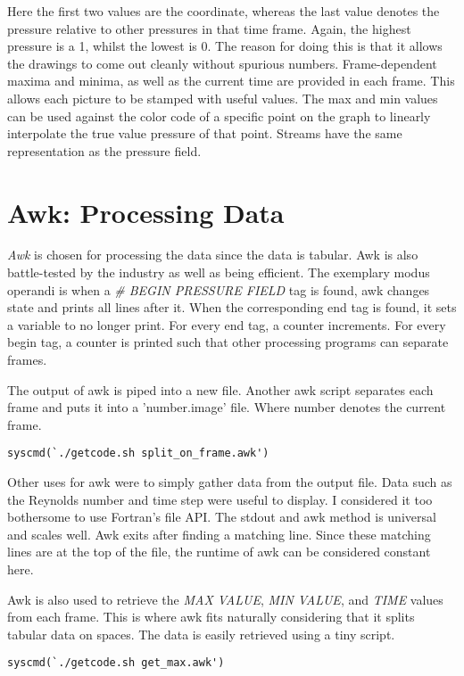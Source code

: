 \documentclass[listof=totoc]{report}
\begin{document}
Here the first two values are the coordinate, whereas the last value denotes the pressure relative to other pressures in that time frame. Again, the highest pressure is a 1, whilst the lowest is 0. The reason for doing this is that it allows the drawings to come out cleanly without spurious numbers. Frame-dependent maxima and minima, as well as the current time are provided in each frame. This allows each picture to be stamped with useful values. The max and min values can be used against the color code of a specific point on the graph to linearly interpolate the true value pressure of that point. Streams have the same representation as the pressure field.

\section{Awk: Processing Data}
\emph{Awk} is chosen for processing the data since the data is tabular. Awk is also battle-tested by the industry as well as being efficient.
The exemplary modus operandi is when a \emph{\# BEGIN PRESSURE FIELD} tag is found, awk changes state and prints all lines after it. When the corresponding end tag is found, it sets a variable to no longer print. For every end tag, a counter increments. For every begin tag, a counter is printed such that other processing programs can separate frames.

The output of awk is piped into a new file. Another awk script separates each frame and puts it into a 'number.image' file. Where number denotes the current frame.

\begin{verbatim}
syscmd(`./getcode.sh split_on_frame.awk')
\end{verbatim}

Other uses for awk were to simply gather data from the output file. Data such as the Reynolds number and time step were useful to display. I considered it too bothersome to use Fortran's file API. The stdout and awk method is universal and scales well. Awk exits after finding a matching line. Since these matching lines are at the top of the file, the runtime of awk can be considered constant here.

Awk is also used to retrieve the \emph{MAX VALUE}, \emph{MIN VALUE}, and \emph{TIME} values from each frame. This is where awk fits naturally considering that it splits tabular data on spaces. The data is easily retrieved using a tiny script.

\begin{verbatim}
syscmd(`./getcode.sh get_max.awk')
\end{verbatim}
\end{document}
